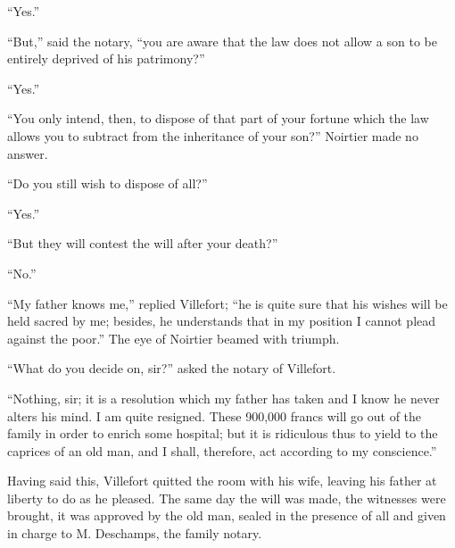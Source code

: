 “Yes.”

“But,” said the notary, “you are aware that the law does not allow a
son to be entirely deprived of his patrimony?”

“Yes.”

“You only intend, then, to dispose of that part of your fortune which
the law allows you to subtract from the inheritance of your son?”
Noirtier made no answer.

“Do you still wish to dispose of all?”

“Yes.”

“But they will contest the will after your death?”

“No.”

“My father knows me,” replied Villefort; “he is quite sure that his
wishes will be held sacred by me; besides, he understands that in my
position I cannot plead against the poor.” The eye of Noirtier beamed
with triumph.

“What do you decide on, sir?” asked the notary of Villefort.

“Nothing, sir; it is a resolution which my father has taken and I know
he never alters his mind. I am quite resigned. These 900,000 francs
will go out of the family in order to enrich some hospital; but it is
ridiculous thus to yield to the caprices of an old man, and I shall,
therefore, act according to my conscience.”

Having said this, Villefort quitted the room with his wife, leaving his
father at liberty to do as he pleased. The same day the will was made,
the witnesses were brought, it was approved by the old man, sealed in
the presence of all and given in charge to M. Deschamps, the family
notary.
